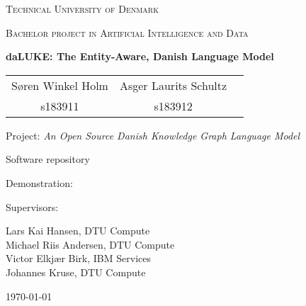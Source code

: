 \documentclass[12pt, fleqn]{report}
\begin{document}
\begin{titlepage}
    \centering
    {\scshape\LARGE Technical University of Denmark \par}
    \vspace{1cm}
    {\scshape\Large Bachelor project in Artificial Intelligence and Data\par}
    \vspace{1.5cm}
    {\huge\bfseries daLUKE: The Entity-Aware, Danish Language Model\par}
    \vspace{2cm}
    \begin{large}
        \centering
        \begin{tabular}{ccc}
                Søren Winkel Holm & Asger Laurits Schultz\\
                s183911 & s183912
        \end{tabular}
    \end{large}\par
    \vfill
    Project: \textit{An Open Source Danish Knowledge Graph Language Model}\par
    Software repository
    \par
    Demonstration:
    \par
    \vspace{2cm}
    Supervisors:\par
    Lars Kai Hansen, DTU Compute\\
    Michael Riis Andersen, DTU Compute\\
    Victor Elkjær Birk, IBM Services\\
    Johannes Kruse, DTU Compute
    \vfill
    {\large \today\par}
\end{titlepage}
\begin{abstract}
    Previous Danish Named Entity Recognition (NER) Results reproduced.
    The English-speaking NER performance of LUKE \cite{yamada2020luke} reproduced.
    A Danish version of LUKE pretrained on Danish text corpus presented as  with NER as a benchmark.
\end{abstract}

\setcounter{tocdepth}{1}
\tableofcontents
\setcounter{tocdepth}{2}









% 

% 

\printbibliography[heading=bibintoc]

% 
\end{document}
